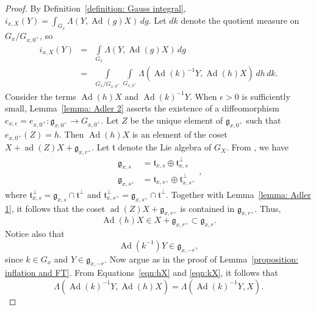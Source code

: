 \documentclass[11pt]{amsart}
\theoremstyle{definition}
\theoremstyle{remark}
\numberwithin{equation}{theorem}
\def\GF{{G}}
\def\gF{{\mathfrak{g}}}
\def\t{{\mathfrak{t}}}
\def\kill#1#2{{\Lambda\left({#1},{#2}\right)}}
\def\i{{i}}
\def\Ad{{\rm Ad}}
\def\ad{{\rm ad}}
\def\Ad{\operatorname{Ad}}
\def\ad{\operatorname{ad}}
\begin{document}
\begin{proof}
By Definition~\ref{definition: Gauss integral}, $\i_{x,X}(Y) =
\int_{\GF_x} \kill{Y}{\Ad(g)X}\, dg$. Let $dk$ denote the quotient
measure on $\GF_x / \GF_{x,0^+}$, so
\begin{eqnarray*}
\i_{x,X}(Y)
    &=& \int\limits_{\GF_x} \kill{Y}{\Ad(g)X}\, dg\\
    &=&\int\limits_{\GF_x / \GF_{x,0^+}} \int\limits_{\GF_{x,0^+}}
\kill{\Ad(k)^{-1}Y}{\Ad(h)X}\, dh\, dk.
\end{eqnarray*}
Consider the terms $\Ad(h)X$ and $\Ad(k)^{-1}Y$. When $\epsilon>0$
is sufficiently small, Lemma~\ref{lemma: Adler 2} asserts the
existence of a diffeomorphism $e_{x,\epsilon}=e_{x,0^+} :
\gF_{x,0^+} \to \GF_{x,0^+}$.  Let $Z$ be the unique element of
$\gF_{x,0^+}$ such that $e_{x,0^+}(Z) = h$. Then $\Ad(h)X$ is an
element of the coset $X + \ad(Z) X + \gF_{x,r^+}$. Let $\t$ denote
the Lie algebra of $\GF_X$. From \cite[1.9.3]{Adler}, we have
\begin{equation}\label{eqn:perp decomp}
    \begin{array}{lll}
    \gF_{x,s} &= {\t}_{x,s}\oplus {\t}_{x,s}^\perp\\
    \gF_{x,s^+} &= {\t}_{x,s^+}\oplus {\t}_{x,s^+}^\perp
    \end{array},
\end{equation}
where ${\t}_{x,s}^\perp = \gF_{x,s} \cap {\t}^\perp$ and
${\t}_{x,s^+}^\perp = \gF_{x,s^+} \cap {\t}^\perp$. Together with
Lemma~\ref{lemma: Adler 1}, it follows that the coset $\ad(Z) X +
\gF_{x,r^+}$ is contained in $\gF_{x,r^+}$. Thus,
\begin{equation}
\Ad(h) X \in X + \gF_{x,r^+} \subset \gF_{x,r}.
    \label{eqn:hX}
\end{equation}
Notice also that
\begin{equation}
\Ad(k^{-1})Y \in \gF_{x,-r},
    \label{eqn:kX}
\end{equation}
since $k \in \GF_x$ and $Y\in \gF_{x,-r}$. Now argue as in the
proof of Lemma~\ref{proposition: inflation and FT}. From
Equations~\ref{eqn:hX} and \ref{eqn:kX}, it follows that
\begin{equation}
\kill{\Ad(k)^{-1}Y}{\Ad(h)X} =
\kill{\Ad(k)^{-1}Y}{X}.\label{eqn:khX}
\end{equation}


\end{proof}
\end{document}
